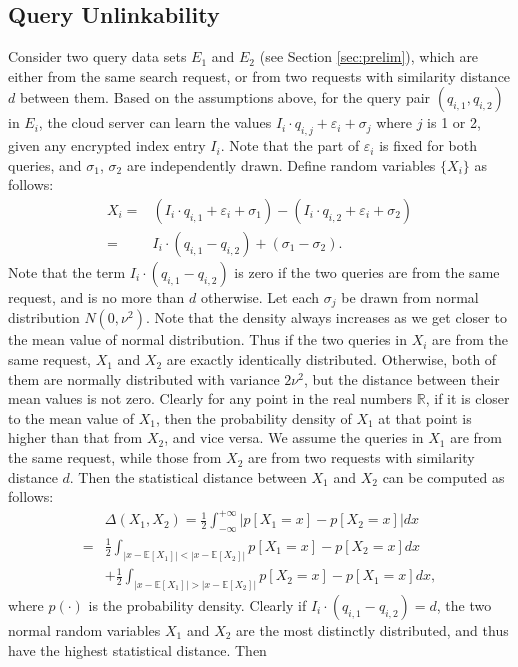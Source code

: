 \documentclass{IEEEtran}
\begin{document}
\subsection{Query Unlinkability}
Consider two query data sets $E_1$ and $E_2$ (see Section \ref{sec:prelim}), which are either from the same search request, or from two requests with similarity distance $d$ between them. Based on the assumptions above, for the query pair $(q_{i,1},q_{i,2})$ in $E_i$, the cloud server can learn the values $I_i\cdot q_{i,j}+\varepsilon_i+\sigma_j$ where $j$ is 1 or 2, given any encrypted index entry $I_i$. Note that the part of $\varepsilon_i$ is fixed for both queries, and $\sigma_1$, $\sigma_2$ are independently drawn. Define random variables $\{X_i\}$ as follows:
$$
\begin{aligned}
X_i = &(I_i\cdot q_{i,1}+\varepsilon_i+\sigma_1) - (I_i\cdot q_{i,2}+\varepsilon_i+\sigma_2)\\
=&I_i\cdot(q_{i,1}-q_{i,2})+(\sigma_1-\sigma_2).
\end{aligned}
$$
Note that the term $I_i\cdot(q_{i,1}-q_{i,2})$ is zero if the two queries are from the same request, and is no more than $d$ otherwise. Let each $\sigma_j$ be drawn from normal distribution $N(0,\nu^2)$. Note that the density always increases as we get closer to the mean value of normal distribution. Thus if the two queries in $X_i$ are from the same request, $X_1$ and $X_2$ are exactly identically distributed. Otherwise, both of them are normally distributed with variance $2\nu^2$, but the distance between their mean values is not zero. Clearly for any point in the real numbers $\mathbb{R}$, if it is closer to the mean value of $X_1$, then the probability density of $X_1$ at that point is higher than that from $X_2$, and vice versa. We assume the queries in $X_1$ are from the same request, while those from $X_2$ are from two requests with similarity distance $d$. Then the statistical distance between $X_1$ and $X_2$ can be computed as follows:
\newcommand{\norm}[1]{| #1 |}
$$\begin{aligned}
&\Delta(X_1, X_2) 
= \frac{1}{2}\int_{-\infty}^{+\infty} \bigg| p[X_1=x] - p[X_2=x] \bigg| dx\\
=& \frac{1}{2}\int_{\norm{x-\mathbb{E}[X_1]} < \norm{x-\mathbb{E}[X_2]}} p[X_1=x] - p[X_2=x]dx \\
&+\frac{1}{2}\int_{\norm{x-\mathbb{E}[X_1]} > \norm{x-\mathbb{E}[X_2]}} p[X_2=x] - p[X_1=x]dx,
\end{aligned}$$
where $p(\cdot)$ is the probability density. 
Clearly if $I_i\cdot(q_{i,1}-q_{i,2})=d$, the two normal random variables $X_1$ and $X_2$ are the most distinctly distributed, and thus have the highest statistical distance. Then
\end{document}

